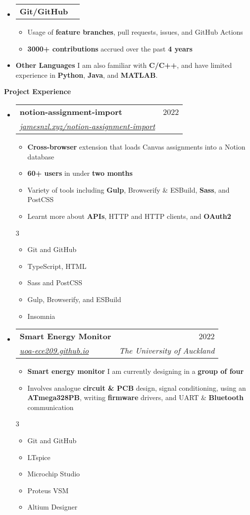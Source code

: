 \documentclass[11pt,a4paper]{article}[leftmargin=*]
\makeatletter
\def \entryspacing {-0pt}
\def \bulletstylei {\faAngleRight\hspace{-4.5pt}}
\def \bulletstyleii {\faCaretRight\hspace{-4.5pt}}
\renewcommand{\section}[2]{\vspace{5pt}
  \colorbox{secondary}{\color{white}\raggedbottom\normalsize\textbf{{#1}{\hspace{2pt}#2\hspace{4pt}}}}
}
\newcommand{\resumeEntryStart}{\begin{itemize}[leftmargin=2.5mm]}
\newcommand{\resumeEntryEnd}{\end{itemize}\vspace{\entryspacing}}
\newcommand{\resumeItemListStart}{\begin{itemize}[leftmargin=4.5mm]}
\newcommand{\resumeItemListEnd}{\end{itemize}}
\newcommand{\resumeItemListStartColumns}[2][-0.5]{\vspace*{#1\multicolsep}
\begin{multicols}{#2}\begin{itemize}[leftmargin=4.5mm]}
\newcommand{\resumeItemListEndColumns}[1][-1]{\end{itemize}\end{multicols}\vspace*{#1\multicolsep}}
\newcommand{\resumeItem}[2][\bulletstylei]{
  \item[\small#1]\small{
    {#2 \vspace{-2pt}}
  }
}
\newcommand{\resumeEntryTSDL}[4]{
  \vspace{-1pt}\item[]
    \begin{tabularx}{0.97\textwidth}{X@{\hspace{60pt}}r}
      \textbf{\color{primary}#1} & {\firabook\color{accent}\small#2} \\
      \textit{\color{accent}\small#3} & \textit{\color{accent}\small#4} \\
    \end{tabularx}\vspace{-6pt}
}
\newcommand{\resumeEntryTD}[2]{
  \vspace{-1pt}\item[]
    \begin{tabularx}{0.97\textwidth}{X@{\hspace{60pt}}r}
      \textbf{\color{primary}#1} & {\firabook\color{accent}\small#2} \\
    \end{tabularx}\vspace{-6pt}
}
\newcommand{\resumeEntryS}[2]{
  \item[]\small{
    \textbf{\color{primary}#1 }{ #2 \vspace{-2pt}}
  }
}
\newcommand{\resumeBf}[1]{\small\textbf{\color{halfbold}#1}}
\makeatother
\begin{document}
\vspace*{-0.5\baselineskip}

\resumeEntryStart
\resumeEntryTD
{Git/GitHub}{}
\resumeItemListStart
\resumeItem {Usage of \resumeBf{feature branches}, pull requests, issues, and GitHub Actions}
\resumeItem {\resumeBf{3000+ contributions} accrued over the past \resumeBf{4 years}}
\resumeItemListEnd
\resumeEntryEnd

\vspace*{-0.5\baselineskip}

\resumeEntryStart
\resumeEntryS
{Other Languages}{I am also familiar with \resumeBf{C/C++}, and have limited experience in \resumeBf{Python}, \resumeBf{Java}, and \resumeBf{MATLAB}.}
\resumeEntryEnd


\section{\faFlask}{Project Experience}

\resumeEntryStart
\resumeEntryTSDL
{notion-assignment-import}{2022}
{\href{https://jamesnzl.xyz/notion-assignment-import}{jamesnzl.xyz/notion-assignment-import}}{}
\resumeItemListStart
\resumeItem {\resumeBf{Cross-browser} extension that loads Canvas assignments into a Notion database}
\resumeItem {\resumeBf{60+ users} in under \resumeBf{two months}}
\resumeItem {Variety of tools including \resumeBf{Gulp}, Browserify \& ESBuild, \resumeBf{Sass}, and PostCSS}
\resumeItem {Learnt more about \resumeBf{APIs}, HTTP and HTTP clients, and \resumeBf{OAuth2}}
\resumeItemListEnd
\resumeItemListStartColumns{3}
\resumeItem[\bulletstyleii] {Git and GitHub}
\resumeItem[\bulletstyleii] {TypeScript, HTML}
\resumeItem[\bulletstyleii] {Sass and PostCSS}
\resumeItem[\bulletstyleii] {Gulp, Browserify, and ESBuild}
\resumeItem[\bulletstyleii] {Insomnia}
\resumeItemListEndColumns
\resumeEntryEnd

\vspace*{-0.5\baselineskip}

\resumeEntryStart
\resumeEntryTSDL
{Smart Energy Monitor}{2022}
{\href{https://uoa-ece209.github.io}{uoa-ece209.github.io}}{The University of Auckland}
\resumeItemListStart
\resumeItem {\resumeBf{Smart energy monitor} I am currently designing in a \resumeBf{group of four}}
\resumeItem {Involves analogue \resumeBf{circuit \& PCB} design, signal conditioning, using an \resumeBf{ATmega328PB}, writing \resumeBf{firmware} drivers, and UART \& \resumeBf{Bluetooth} communication}
\resumeItemListEnd
\resumeItemListStartColumns{3}
\resumeItem[\bulletstyleii] {Git and GitHub}
\resumeItem[\bulletstyleii] {LTspice}
\resumeItem[\bulletstyleii] {Microchip Studio}
\resumeItem[\bulletstyleii] {Proteus VSM}
\resumeItem[\bulletstyleii] {Altium Designer}
\resumeItemListEndColumns
\resumeEntryEnd
\end{document}
